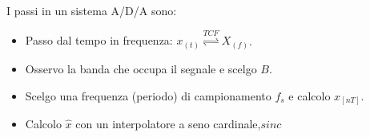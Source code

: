         I passi in un sistema A/D/A sono:
        \begin{itemize}
            \item {Passo dal tempo in frequenza: $x_{(t)} \overset{TCF}{\rightleftharpoons} X_{(f)}$}.
            \item {Osservo la banda che occupa il segnale e scelgo $B$.}
            \item {Scelgo una frequenza (periodo) di campionamento $f_s$ e calcolo $x_{[nT]}$.}
            \item {Calcolo $\hat{x}$ con un interpolatore a seno cardinale,$sinc$}
        \end{itemize}
























